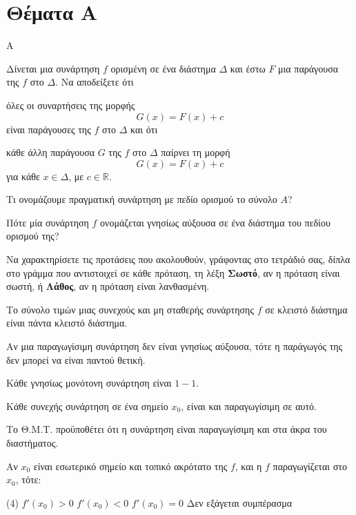 \section{Θέματα Α}
\begin{thema}{A}
\begin{erwthma}
    \item Δίνεται μια συνάρτηση $ f $ ορισμένη σε ένα διάστημα $ \varDelta $ και έστω $ F $ μια παράγουσα της $ f $ στο $ \varDelta $. Να αποδείξετε ότι \begin{alist} \item όλες οι συναρτήσεις της μορφής \[ G(x)=F(x)+c \] είναι παράγουσες της $ f $ στο $ \varDelta $ και ότι \item κάθε άλλη παράγουσα $ G $ της $ f $ στο $ \varDelta $ παίρνει τη μορφή \[ G(x)=F(x)+c \] για κάθε $ x\in\varDelta $, με $ c\in\mathbb{R} $. \end{alist}
    \item Τι ονομάζουμε πραγματική συνάρτηση με πεδίο ορισμού το σύνολο $A$?
    \item Πότε μία συνάρτηση $f$ ονομάζεται γνησίως αύξουσα σε ένα διάστημα του πεδίου ορισμού της?
    \item Να χαρακτηρίσετε τις προτάσεις που ακολουθούν, γράφοντας στο τετράδιό σας, δίπλα στο γράμμα που αντιστοιχεί σε κάθε πρόταση, τη λέξη \textbf{Σωστό}, αν η πρόταση είναι σωστή, ή \textbf{Λάθος}, αν η πρόταση είναι λανθασμένη.
    \begin{alist}
        \item Το σύνολο τιμών μιας συνεχούς και μη σταθερής συνάρτησης $f$ σε κλειστό διάστημα είναι πάντα κλειστό διάστημα.
        \item Αν μια παραγωγίσιμη συνάρτηση δεν είναι γνησίως αύξουσα, τότε η παράγωγός της δεν μπορεί να είναι παντού θετική.
        \item Κάθε γνησίως μονότονη συνάρτηση είναι $1-1$.
        \item Κάθε συνεχής συνάρτηση σε ένα σημείο $x_0$, είναι και παραγωγίσιμη σε αυτό.
        \item Το Θ.Μ.Τ. προϋποθέτει ότι η συνάρτηση είναι παραγωγίσιμη και στα άκρα του διαστήματος.
    \end{alist}
    \item Αν $x_0$ είναι εσωτερικό σημείο και τοπικό ακρότατο της $f$, και η $f$ παραγωγίζεται στο $x_0$, τότε:
    \begin{tasks}[label=\let\textdexiakeraia\relax\alph*.](4)
        \task $f'(x_0) > 0$
        \task $f'(x_0) < 0$
        \task $f'(x_0) = 0$
        \task Δεν εξάγεται συμπέρασμα
    \end{tasks}
\end{erwthma}
\end{thema}


